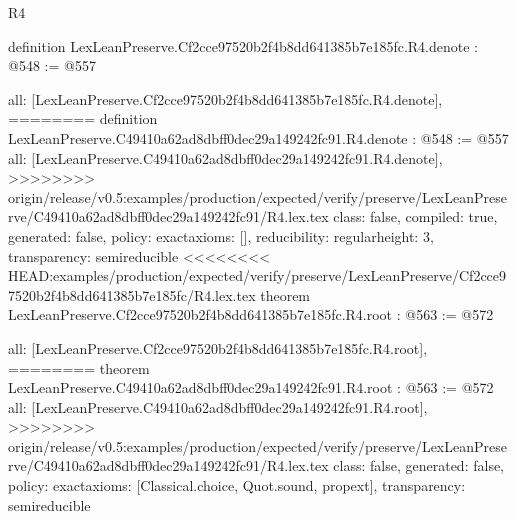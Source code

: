 \begin{lexlean}{R4}
\begin{coremodule}
{{{{{{definition LexLeanPreserve.Cf2cce97520b2f4b8dd641385b7e185fc.R4.denote : @548 := @557 {
  all: [LexLeanPreserve.Cf2cce97520b2f4b8dd641385b7e185fc.R4.denote],
========
definition LexLeanPreserve.C49410a62ad8dbff0dec29a149242fc91.R4.denote : @548 := @557 {
  all: [LexLeanPreserve.C49410a62ad8dbff0dec29a149242fc91.R4.denote],
>>>>>>>> origin/release/v0.5:examples/production/expected/verify/preserve/LexLeanPreserve/C49410a62ad8dbff0dec29a149242fc91/R4.lex.tex
  class: false,
  compiled: true,
  generated: false,
  policy: exact{axioms: []},
  reducibility: regular{height: 3},
  transparency: semireducible
}
<<<<<<<< HEAD:examples/production/expected/verify/preserve/LexLeanPreserve/Cf2cce97520b2f4b8dd641385b7e185fc/R4.lex.tex
theorem LexLeanPreserve.Cf2cce97520b2f4b8dd641385b7e185fc.R4.root : @563 := @572 {
  all: [LexLeanPreserve.Cf2cce97520b2f4b8dd641385b7e185fc.R4.root],
========
theorem LexLeanPreserve.C49410a62ad8dbff0dec29a149242fc91.R4.root : @563 := @572 {
  all: [LexLeanPreserve.C49410a62ad8dbff0dec29a149242fc91.R4.root],
>>>>>>>> origin/release/v0.5:examples/production/expected/verify/preserve/LexLeanPreserve/C49410a62ad8dbff0dec29a149242fc91/R4.lex.tex
  class: false,
  generated: false,
  policy: exact{axioms: [Classical.choice, Quot.sound, propext]},
  transparency: semireducible
}

}}}}}}}}
\end{coremodule}
\end{lexlean}
